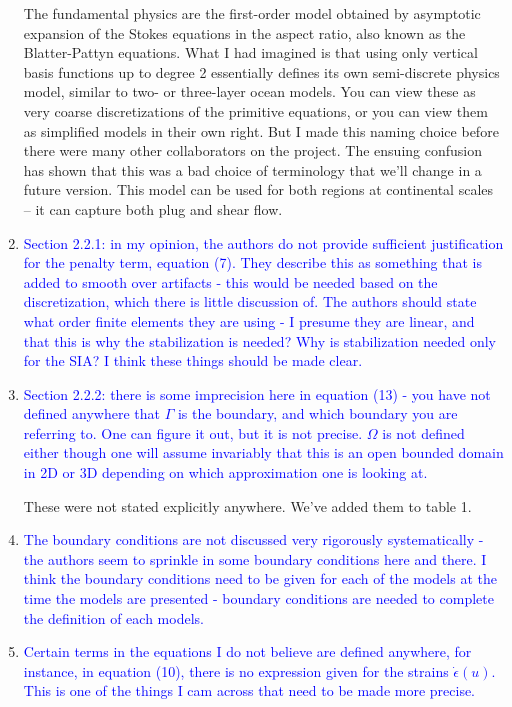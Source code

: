 \documentclass{article}
\theoremstyle{definition}
\theoremstyle{plain}
\begin{document}
\begin{enumerate}
The fundamental physics are the first-order model obtained by asymptotic expansion of the Stokes equations in the aspect ratio, also known as the Blatter-Pattyn equations.
What I had imagined is that using only vertical basis functions up to degree 2 essentially defines its own semi-discrete physics model, similar to two- or three-layer ocean models.
You can view these as very coarse discretizations of the primitive equations, or you can view them as simplified models in their own right.
But I made this naming choice before there were many other collaborators on the project.
The ensuing confusion has shown that this was a bad choice of terminology that we'll change in a future version.
This model can be used for both regions at continental scales -- it can capture both plug and shear flow.

\item \textcolor{blue}{Section 2.2.1: in my opinion, the authors do not provide sufficient justification for the penalty term,
equation (7). They describe this as something that is added to smooth over artifacts - this would be
needed based on the discretization, which there is little discussion of. The authors should state what
order finite elements they are using - I presume they are linear, and that this is why the stabilization
is needed? Why is stabilization needed only for the SIA? I think these things should be made clear.}
\item \textcolor{blue}{Section 2.2.2: there is some imprecision here in equation (13) - you have not defined anywhere that $\Gamma$
is the boundary, and which boundary you are referring to. One can figure it out, but it is not precise.
$\Omega$ is not defined either though one will assume invariably that this is an open bounded domain in 2D
or 3D depending on which approximation one is looking at.}

These were not stated explicitly anywhere.
We've added them to table 1.
\item \textcolor{blue}{The boundary conditions are not discussed very rigorously systematically - the authors seem to
sprinkle in some boundary conditions here and there. I think the boundary conditions need to be
given for each of the models at the time the models are presented - boundary conditions are needed
to complete the definition of each models.}
\item \textcolor{blue}{Certain terms in the equations I do not believe are defined anywhere, for instance, in equation (10),
there is no expression given for the strains $\dot\epsilon(u)$.
This is one of the things I cam across that need to
be made more precise.}


\end{enumerate}
\end{document}

